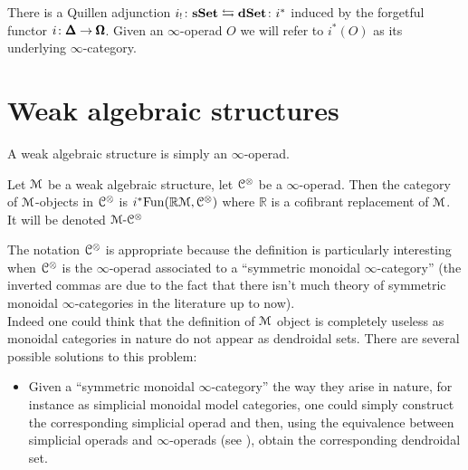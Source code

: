 \begin{refsection}
\begin{remark}
There is a Quillen adjunction $i_! \colon \mathbf{s\,\!\mathbf{Set}} \leftrightarrows \mathbf{dSet} \colon i^*$ induced by the forgetful functor $i \colon \pmb{\Delta} \to \pmb{\Omega}$. Given an $\infty$-operad $O$ we will refer
to $i^*(O)$ as its underlying $\infty$-category.
\end{remark}


\section{Weak algebraic structures}

\begin{definition}
A weak algebraic structure is simply an $\infty$-operad.

Let $\mathcal{M}$ be a weak algebraic structure, let $\mathcal{C}^{\otimes}$ be a $\infty$-operad. Then the category of $\mathcal{M}$-objects in $\mathcal{C}^{\otimes}$ is $i^* \mathrm{Fun}(\mathbb{R}\mathcal{M},\mathcal{C}^{\otimes})$ where $\mathbb{R}$ is a cofibrant replacement of $\mathcal{M}$. It will be denoted $\mathcal{M} \textrm{-} \mathcal{C}^{\otimes}$
\end{definition}

The notation $\mathcal{C}^{\otimes}$ is appropriate because the definition is particularly interesting when $\mathcal{C}^{\otimes}$ is the $\infty$-operad associated to a ``symmetric monoidal $\infty$-category'' (the inverted commas are due to the fact that there isn't much theory of symmetric monoidal $\infty$-categories in the literature up to now).\\

Indeed one could think that the definition of $\mathcal{M}$ object is completely useless as monoidal categories in nature do not appear as dendroidal sets. There are several possible solutions to this problem:
\begin{itemize}
	\item Given a ``symmetric monoidal $\infty$-category'' the way they arise in nature, for instance as simplicial monoidal model categories, one could simply construct the corresponding simplicial operad and then, using the equivalence between simplicial operads and $\infty$-operads (see \cite{Ci-Mo2}), obtain the corresponding dendroidal set.


\end{itemize}
\end{refsection}
